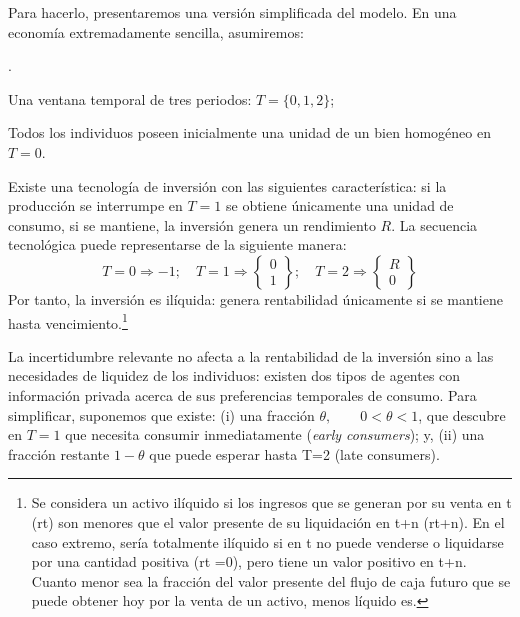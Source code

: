 \documentclass[10pt,a4paper]{article}
\newcounter{numitem}
\newenvironment{lnum}
      {\begin{list}{\arabic{numitem}.}{%
          \usecounter{numitem}%
          \setlength{\leftmargin}{1cm}%
          \setlength{\parskip}{3pt}%
          \setlength{\itemsep}{0pt}%
          \setlength{\parsep}{0pt}%
      }}
      {\end{list}}
\begin{document}
Para hacerlo, presentaremos una versión simplificada del modelo. En una economía extremadamente sencilla, asumiremos:
\begin{lnum}
    \item Una ventana temporal de tres periodos: $T=\{0,1,2\}$;
    \item Todos los individuos poseen inicialmente una unidad de un bien homogéneo en $T=0$.
    \item Existe una tecnología de inversión con las siguientes característica: si la producción se interrumpe en $T=1$ se obtiene únicamente una unidad de consumo, si se mantiene, la inversión genera un rendimiento $R$. La secuencia tecnológica puede representarse de la siguiente manera: 
    $$T=0\Rightarrow -1;\quad T=1\Rightarrow\left\{\begin{aligned}0\\1\end{aligned}\right\};\quad T=2\Rightarrow\left\{\begin{aligned}R\\0\end{aligned}\right\}$$
    Por tanto, la inversión es ilíquida: genera rentabilidad únicamente si se mantiene hasta vencimiento.\footnote{%
        Se considera un activo ilíquido si los ingresos que se generan por su venta en t (rt) son menores que el valor presente de su liquidación en t+n (rt+n). En el caso extremo, sería totalmente ilíquido si en t no puede venderse o liquidarse por una cantidad positiva (rt =0), pero tiene un valor positivo en t+n. Cuanto menor sea la fracción del valor presente del flujo de caja futuro que se puede obtener hoy por la venta de un activo, menos líquido es.
    }
    \item La incertidumbre relevante no afecta a la rentabilidad de la inversión sino a las necesidades de liquidez de los individuos: existen dos tipos de agentes con información privada acerca de sus preferencias temporales de consumo. Para simplificar, suponemos que existe: (i) una fracción $\theta,\qquad 0<\theta<1$, que descubre en $T=1$ que necesita consumir inmediatamente (\textit{early consumers}); y, (ii) una fracción restante $1-\theta$ que puede esperar hasta T=2 (late consumers).
\end{lnum}
\end{document}
